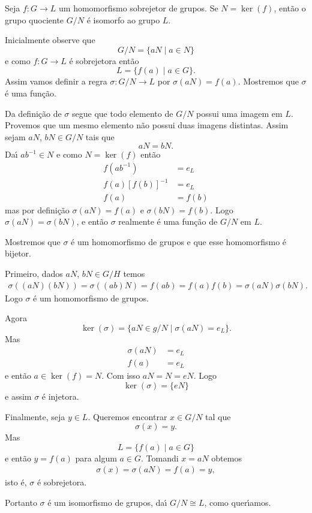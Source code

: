 \begin{teorema}\label{primeiro_teorema_homomorfismo}
    Seja $f : G \to L$ um homomorfismo sobrejetor de grupos. Se $N = \ker(f)$, ent\~ao o grupo quociente $G/N$ \'e isomorfo ao grupo $L$.
\end{teorema}
\begin{prova}
	Inicialmente observe que
	\[
		G/N = \{aN \mid a \in N\}
	\]
	e como $f : G \to L$ \'e sobrejetora ent\~ao
	\[
		L = \{f(a) \mid a \in G\}.
	\]
	Assim vamos definir a regra $\sigma : G/N \to L$ por $\sigma(aN) = f(a)$. Mostremos que $\sigma$ \'e uma fun\c{c}\~ao.

	Da defini\c{c}\~ao de $\sigma$ segue que todo elemento de $G/N$ possui uma imagem em $L$. Provemos que um mesmo elemento n\~ao possui duas imagens distintas. Assim sejam $aN$, $bN \in G/N$ tais que
	\[
		aN = bN.
	\]
	Da{\'\i} $ab^{-1} \in N$ e como $N = \ker(f)$ ent\~ao
	\begin{align*}
		f(ab^{-1}) &= e_L\\
		f(a)[f(b)]^{-1} &= e_L\\
		f(a) &= f(b)
	\end{align*}
	mas por defini\c{c}\~ao $\sigma(aN) = f(a)$ e $\sigma(bN) = f(b)$. Logo $\sigma(aN) = \sigma(bN)$, e ent\~ao $\sigma$ realmente \'e uma fun\c{c}\~ao de $G/N$ em $L$.

	Mostremos que $\sigma$ \'e um homomorfismo de grupos e que esse homomorfismo \'e bijetor.

	Primeiro, dados $aN$, $bN \in G/H$ temos
	\begin{align*}
		\sigma((aN)(bN)) = \sigma((ab)N) = f(ab) = f(a)f(b) = \sigma(aN)\sigma(bN).
	\end{align*}
	Logo $\sigma$ \'e um homomorfismo de grupos.

	Agora
	\[
		\ker(\sigma) = \{aN \in g/N \mid \sigma(aN) = e_L\}.
	\]
	Mas
	\begin{align*}
		\sigma(aN) &= e_L\\
		f(a) &= e_L
	\end{align*}
	e ent\~ao $a \in \ker(f) = N$. Com isso $aN = N = eN$. Logo
	\[
		\ker(\sigma) = \{eN\}
	\]
	e assim $\sigma$ \'e injetora.

	Finalmente, seja $y \in L$. Queremos encontrar $x \in G/N$ tal que
	\[
		\sigma(x) = y.
	\]
	Mas
	\[
		L = \{f(a) \mid a \in G\}
	\]
	e ent\~ao $y = f(a)$ para algum $a \in G$. Tomandi $x = aN$ obtemos
	\begin{align*}
		\sigma(x) = \sigma(aN) = f(a) = y,
	\end{align*}
	isto \'e, $\sigma$ \'e sobrejetora.

	Portanto $\sigma$ \'e um isomorfismo de grupos, da{\'\i} $G/N \cong L$, como quer{\'\i}amos.
\end{prova}

